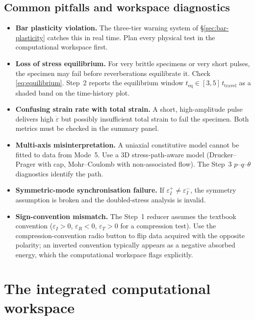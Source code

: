 \documentclass[11pt,a4paper,openany]{book}
\theoremstyle{handbook}
\newcommand{\eps}{\varepsilon}
\newcommand{\epsdot}{\dot\eps}
\begin{document}
\section{Common pitfalls and workspace diagnostics}

\begin{itemize}[leftmargin=*,itemsep=3pt]
  \item \textbf{Bar plasticity violation.} The three-tier warning system of
        \S\ref{sec:bar-plasticity} catches this in real time. Plan every
        physical test in the computational workspace first.
  \item \textbf{Loss of stress equilibrium.} For very brittle specimens or
        very short pulses, the specimen may fail before reverberations
        equilibrate it. Check \eqref{eq:equilibrium}. Step~2 reports the
        equilibrium window $t_{\text{eq}}\in[3,5]\,t_{\text{travel}}$ as a
        shaded band on the time-history plot.
  \item \textbf{Confusing strain rate with total strain.} A short,
        high-amplitude pulse delivers high $\epsdot$ but possibly
        insufficient total strain to fail the specimen. Both metrics must
        be checked in the summary panel.
  \item \textbf{Multi-axis misinterpretation.} A uniaxial constitutive model
        cannot be fitted to data from Mode~5. Use a 3D stress-path-aware
        model (Drucker--Prager with cap, Mohr--Coulomb with non-associated
        flow). The Step~3 $p$--$q$--$\theta$ diagnostics identify the
        path.
  \item \textbf{Symmetric-mode synchronisation failure.} If
        $\eps_I^{+}\neq\eps_I^{-}$, the symmetry assumption is broken and
        the doubled-stress analysis is invalid.
  \item \textbf{Sign-convention mismatch.} The Step~1 reducer assumes the
        textbook convention ($\eps_I>0$, $\eps_R<0$, $\eps_T>0$ for a
        compression test). Use the compression-convention radio button to
        flip data acquired with the opposite polarity; an inverted
        convention typically appears as a negative absorbed energy, which
        the computational workspace flags explicitly.
\end{itemize}

\chapter{The integrated computational workspace}\label{ch:integrated}
\end{document}
